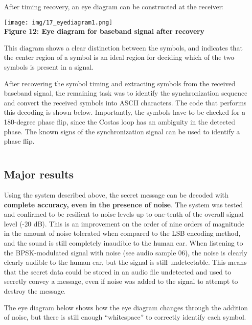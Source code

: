 \documentclass{article}
\begin{document}
After timing recovery, an eye diagram can be constructed at the receiver:

\begin{center}
  \texttt{[image: img/17\_eyediagram1.png]} \\
  \textbf{Figure 12: Eye diagram for baseband signal after recovery}
\end{center}

This diagram shows a clear distinction between the symbols, and indicates that the 
center region of a symbol is an ideal region for deciding which of the two symbols
is present in a signal.

\vspace{6pt}

After recovering the symbol timing and extracting symbols from the received
baseband signal, the remaining task was to identify the synchronization sequence
and convert the received symbols into ASCII characters. The code that performs
this decoding is shown below. Importantly, the symbols have to be checked for
a 180-degree phase flip, since the Costas loop has an ambiguity in the
detected phase. The known signs of the synchronization signal can be used to
identify a phase flip.

\inputminted[xleftmargin=24pt, linenos=true, breaklines, firstline=107, lastline=132]{matlab}{src/decode_message_BPSK.m}

\subsection{Major results}
Using the system described above, the secret message can be decoded
with \textbf{complete accuracy, even in the presence of noise}. The system
was tested and confirmed to be resilient to noise levels up to one-tenth
of the overall signal level (-20 dB). This is an improvement on the order of
nine orders of magnitude in the amount of noise tolerated when compared to the
LSB encoding method, and the sound is still completely inaudible to the human ear.
When listening to the BPSK-modulated signal with noise (see audio sample 06), the noise is clearly
clearly audible to the human ear, but the signal is still undetectable. This means that the secret data could be stored in an audio file undetected and
used to secretly convey a message, even if noise was added to the signal to
attempt to destroy the message.
 
\vspace{6pt}

The eye diagram below shows how the eye diagram changes through the addition of
noise, but there is still enough ``whitespace'' to correctly identify each symbol.
\end{document}
